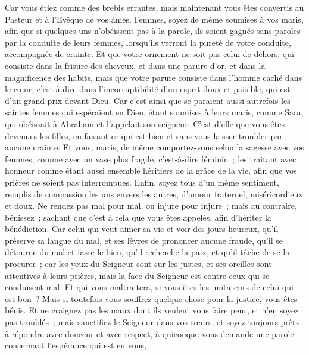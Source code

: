 \begin{multicols}{2}
Car vous étiez comme des brebis errantes, mais maintenant vous êtes convertis au Pasteur et à l'Evêque de vos âmes. 
\VerseOne{}Femmes, soyez de même soumises à vos maris, afin que si quelques-uns n'obéissent pas à la parole, ils soient gagnés sans paroles par la conduite de leurs femmes,
lorsqu'ils verront la pureté de votre conduite, accompagnée de crainte.
Et que votre ornement ne soit pas celui de dehors, qui consiste dans la frisure des cheveux, et dans une parure d'or, et dans la magnificence des habits,
mais que votre parure consiste dans l'homme caché dans le cœur, c'est-à-dire dans l'incorruptibilité d'un esprit doux et paisible, qui est d'un grand prix devant Dieu.
Car c'est ainsi que se paraient aussi autrefois les saintes femmes qui espéraient en Dieu, étant soumises à leurs maris,
comme Sara, qui obéissait à Abraham et l'appelait son seigneur. C'est d'elle que vous êtes devenues les filles, en faisant ce qui est bien et sans vous laisser troubler par aucune crainte.
Et vous, maris, de même comportez-vous selon la sagesse avec vos femmes, comme avec un vase plus fragile, c'est-à-dire féminin~; les traitant avec honneur comme étant aussi ensemble héritiers de la grâce de la vie, afin que vos prières ne soient pas interrompues. 
Enfin, soyez tous d'un même sentiment, remplis de compassion les uns envers les autres, d'amour fraternel, miséricordieux et doux.
Ne rendez pas mal pour mal, ou injure pour injure~; mais au contraire, bénissez~; sachant que c'est à cela que vous êtes appelés, afin d'hériter la bénédiction.
Car celui qui veut aimer sa vie et voir des jours heureux, qu'il préserve sa langue du mal, et ses lèvres de prononcer aucune fraude,
qu'il se détourne du mal et fasse le bien, qu'il recherche la paix, et qu'il tâche de se la procurer~;
car les yeux du Seigneur sont sur les justes, et ses oreilles sont attentives à leurs prières, mais la face du Seigneur est contre ceux qui se conduisent mal.
Et qui vous maltraitera, si vous êtes les imitateurs de celui qui est bon~?
Mais si toutefois vous souffrez quelque chose pour la justice, vous êtes bénis. Et ne craignez pas les maux dont ils veulent vous faire peur, et n'en soyez pas troublés~;
mais sanctifiez le Seigneur dans vos cœurs, et soyez toujours prêts à répondre avec douceur et avec respect, à quiconque vous demande une parole concernant l'espérance qui est en vous, 

\end{multicols}
